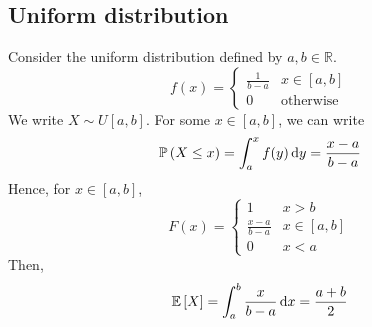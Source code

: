 \subsection{Uniform distribution}
Consider the uniform distribution defined by \(a, b \in\mathbb R\).
\[
	f(x) = \begin{cases}
		\frac{1}{b-a} & x \in [a, b]     \\
		0             & \text{otherwise}
	\end{cases}
\]
We write \(X \sim U[a, b]\).
For some \(x \in [a,b]\), we can write
\[
	\mathbb{P}\left({X \leq x}\right) = \int_a^x f(y) \dd{y} = \frac{x-a}{b-a}
\]
Hence, for \(x \in [a,b]\),
\[
	F(x) = \begin{cases}
		1               & x > b       \\
		\frac{x-a}{b-a} & x \in [a,b] \\
		0               & x < a
	\end{cases}
\]
Then,
\[
	\mathbb{E}\left[{X}\right] = \int_a^b \frac{x}{b-a} \dd{x} = \frac{a+b}{2}
\]

